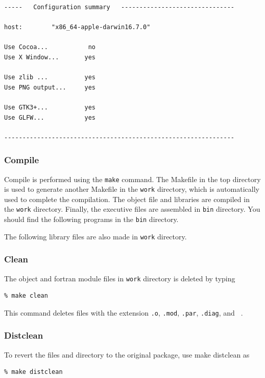 {\small
\begin{verbatim}
-----   Configuration summary   -------------------------------

host:        "x86_64-apple-darwin16.7.0"

Use Cocoa...           no
Use X Window...       yes

Use zlib ...          yes
Use PNG output...     yes

Use GTK3+...          yes
Use GLFW...           yes

---------------------------------------------------------------
\end{verbatim}
}


\subsubsection{Compile}
Compile is performed using the {\tt make} command. The Makefile in the top directory is used to generate another Makefile in the {\tt work} directory, which is automatically used to complete the compilation. The object file and libraries are compiled in the {\tt work} directory. Finally, the executive files are assembled in {\tt bin} directory. You should find the following programs in the {\tt bin} directory.
%
%
The following library files are also made in {\tt work} directory.
%
%

\subsubsection{Clean}
The object and fortran module files in {\tt work} directory is deleted by typing
\begin{verbatim}
% make clean
\end{verbatim}
This command deletes files with the extension {\tt .o}, {\tt .mod}, {\tt .par}, {\tt .diag}, and {\tt ~}.

\subsubsection{Distclean}
To revert the files and directory to the original package, use make distclean as
\begin{verbatim}
% make distclean
\end{verbatim}

